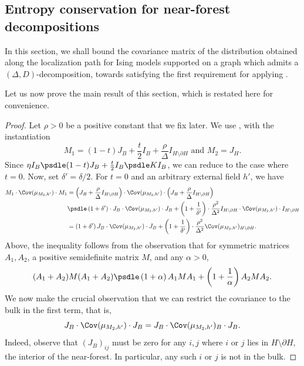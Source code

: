 \documentclass[11pt,letterpaper]{article}
\begin{document}
\subsection{Entropy conservation for near-forest decompositions}
\label{sec:entropy-conservation-spinglass}
 
    In this section, we shall bound the covariance matrix of the distribution obtained along the localization path for Ising models supported on a graph which admits a $(\Delta, D)$-decomposition, towards satisfying the first requirement for applying . 

    Let us now prove the main result of this section, which is restated here for convenience.
    \entropyconservation*
    \begin{proof}
        Let $\rho > 0$ be a positive constant that we fix later.
        We use , with the instantiation
        \[ M_1 = (1-t) J_B + \frac{t}{2}I_B +  \frac{\rho}{\Delta} I_{H \setminus \partial H} \text{ and } M_2 = J_H. \]
        Since $\eta I_B \psdle (1-t) J_B + \frac{t}{2}I_B \psdle K I_B$, we can reduce to the case where $t=0$.
        Now, set $\delta' = \delta/2$.
        For $t=0$ and an arbitrary external field $h'$, we have
        \begin{align*}
            M_1 \cdot \Cov(\mu_{M_2,h'}) \cdot M_1 &= \left( J_B + \frac{\rho}{\Delta} I_{H \setminus \partial H} \right) \cdot \Cov(\mu_{M_2,h'}) \cdot \left( J_B + \frac{\rho}{\Delta} I_{H \setminus \partial H} \right) \\
                &\psdle \left( 1 + \delta' \right) \cdot J_B \cdot \Cov(\mu_{M_2,h'}) \cdot J_B + \left( 1 + \frac{1}{\delta'} \right) \cdot \frac{\rho^2}{\Delta^2} I_{H \setminus \partial H} \cdot \Cov(\mu_{M_2,h'}) \cdot I_{H \setminus \partial H} \\
                &= \left(1 + \delta'\right) J_B \cdot \Cov(\mu_{M_2,h'}) \cdot J_B + \left(1 + \frac{1}{\delta'}\right) \cdot \frac{\rho^2}{\Delta^2} \Cov(\mu_{M_2,h'})_{H \setminus \partial H}.
        \end{align*}
        Above, the inequality follows from the observation that for symmetric matrices $A_1,A_2$, a positive semidefinite matrix $M$, and any $\alpha > 0$,
        \[ (A_1 + A_2) M (A_1 + A_2) \psdle \left(1+\alpha\right) A_1 M A_1 + \left(1 + \frac{1}{\alpha}\right) A_2 M A_2. \]
        We now make the crucial observation that we can restrict the covariance to the bulk in the first term, that is, 
        \[ J_B \cdot \Cov(\mu_{M_2,h'}) \cdot J_B = J_B \cdot \Cov(\mu_{M_2,h'})_B \cdot J_B. \]
        Indeed, observe that $(J_B)_{ij}$ must be zero for any $i,j$ where $i$ or $j$ lies in $H \setminus \partial H$, the interior of the near-forest. In particular, any such $i$ or $j$ is not in the bulk.


\end{proof}
\end{document}

